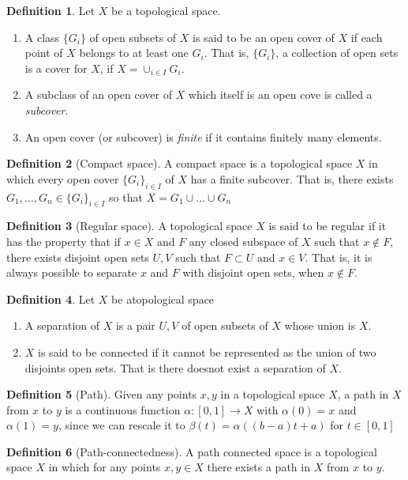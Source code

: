 \documentclass[a4paper, 12pt]{scrartcl}
\theoremstyle{definition}
\newtheorem{defn}{Definition}[section]
\newcommand{\lra}{\longrightarrow}
\begin{document}
    \begin{defn} 
        Let $X$ be a topological space.
        \begin{enumerate}
            \item A class $\{G_i\}$ of open subsets of $X$ is said to be an open cover of $X$ if each point of $X$ belongs to at least one $G_i$. That is, $\{G_i\}$, a collection of open sets is a cover for $X$, if $X = \cup_{i \in I} G_i$.
            \item A subclass of an open cover of $X$ which itself is an open cove is called a \textit{subcover}.
            \item An open cover (or subcover) is \textit{finite} if it contains finitely many elements. 
        \end{enumerate}
    \end{defn}

    \begin{defn}[Compact space]
        A compact space is a topological space $X$ in which every open cover $\{G_i\}_{i \in I}$ of $X$ has a finite subcover. That is, there exists $G_1, \ldots, G_n \in \{G_i\}_{i \in I}$ so that $X  = G_1 \cup \ldots \cup G_n$ 
    \end{defn}

    \begin{defn}[Regular space]
        A topological space $X$ is said to be regular if it has the property that if $x \in X$ and $F$ any closed subspace of $X$ such that $x \notin F$, there exists disjoint open sets $U,V$ such that $F \subset U$ and $x \in V$. That is, it is always possible to separate $x$ and $F$ with disjoint open sets, when $x \notin F$.
    \end{defn}

    \begin{defn}
        Let $X$ be atopological space 
        \begin{enumerate}
            \item A separation of $X$ is a pair $U,V$ of open subsets of $X$ whose union is $X$.
            \item $X$ is said to be connected if it cannot be represented as the union of two disjoints open sets. That is there doesnot exist a separation of $X$.
        \end{enumerate}
    \end{defn}
    
    \begin{defn}[Path]
        Given any points $x,y$ in a topological space $X$, a path in $X$ from $x$ to $y$ is a continuous function $\alpha : [0,1] \lra X$ with $\alpha(0) = x$ and $\alpha(1) = y$, since we can rescale it to $\beta(t) = \alpha((b-a)t + a)$ for $t \in [0,1]$
    \end{defn}
    \begin{defn}[Path-connectedness]
        A path connected space is a topological space $X$ in which for any points $x,y \in X$ there exists a path in $X$ from $x$ to $y$.
    \end{defn}
    
\end{document}
